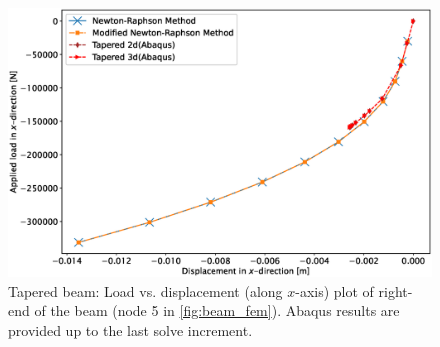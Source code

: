 \documentclass{article}
\begin{document}
\begin{figure}[H]
    \centering
    \includegraphics[width = 1\textwidth ]{figures/comparison_tapered.eps}
    \caption{Tapered beam: Load vs. displacement (along $x$-axis) plot of right-end of the beam (node 5 in \cref{fig:beam_fem}). Abaqus results are provided up to the last solve increment.}
    \label{fig:result_tapered_beam}
\end{figure}


%
%
\end{document}
